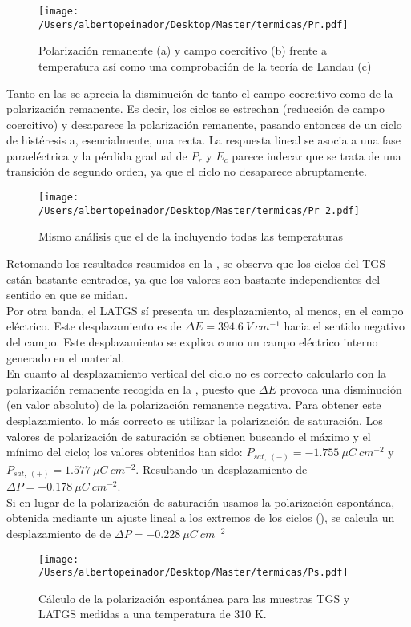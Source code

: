 \documentclass[a4paper, 12pt, spanish]{article}
\begin{document}
\begin{multicols}{2}
\begin{figure}[H]
    \centering
    \texttt{[image: /Users/albertopeinador/Desktop/Master/termicas/Pr.pdf]}
    \caption{Polarización remanente (a) y campo coercitivo (b) frente a temperatura así como una comprobación de la teoría de Landau (c)}\label{fig:param1}
\end{figure}
Tanto en las  se aprecia la disminución de tanto el campo coercitivo como de la polarización remanente. Es decir, los ciclos se estrechan (reducción de campo coercitivo) y desaparece la polarización remanente, pasando entonces de un ciclo de histéresis a, esencialmente, una recta. La respuesta lineal se asocia a una fase paraeléctrica y la pérdida gradual de $P_r$ y $E_c$ parece indecar que se trata de una transición de segundo orden, ya que el ciclo no desaparece abruptamente.
\begin{figure}[H]
    \centering
    \texttt{[image: /Users/albertopeinador/Desktop/Master/termicas/Pr\_2.pdf]}
    \caption{Mismo análisis que el de la  incluyendo todas las temperaturas}\label{fig:Pr2}
\end{figure}

Retomando los resultados resumidos en la , se observa que los ciclos del TGS están bastante centrados, ya que los valores son bastante independientes del sentido en que se midan.\\
Por otra banda, el LATGS sí presenta un desplazamiento, al menos, en el campo eléctrico. Este desplazamiento es de $\Delta E = 394.6\ V\ cm^{-1}$ hacia el sentido negativo del campo. Este desplazamiento se explica como un campo eléctrico interno generado en el material.\\
En cuanto al desplazamiento vertical del ciclo no es correcto calcularlo con la polarización remanente recogida en la , puesto que $\Delta E$ provoca una disminución (en valor absoluto) de la polarización remanente negativa. Para obtener este desplazamiento, lo más correcto es utilizar la polarización de saturación. Los valores de polarización de saturación se obtienen buscando el máximo y el mínimo del ciclo; los valores obtenidos han sido: $P_{sat,\ (-)} = -1.755\ \mu C\ cm^{-2}$ y $P_{sat,\ (+)} = 1.577\ \mu C\ cm^{-2}$. Resultando un desplazamiento de $\Delta P = -0.178\ \mu C\ cm^{-2}$.\\
Si en lugar de la polarización de saturación usamos la polarización espontánea, obtenida mediante un ajuste lineal a los extremos de los ciclos (), se calcula un desplazamiento de de $\Delta P = -0.228\ \mu C\ cm^{-2}$
\begin{figure}[H]
    \centering
    \texttt{[image: /Users/albertopeinador/Desktop/Master/termicas/Ps.pdf]}
    \caption{Cálculo de la polarización espontánea para las muestras TGS y LATGS medidas a una temperatura de 310 K.}\label{fig:P_s}
\end{figure}

\end{multicols}
\end{document}
